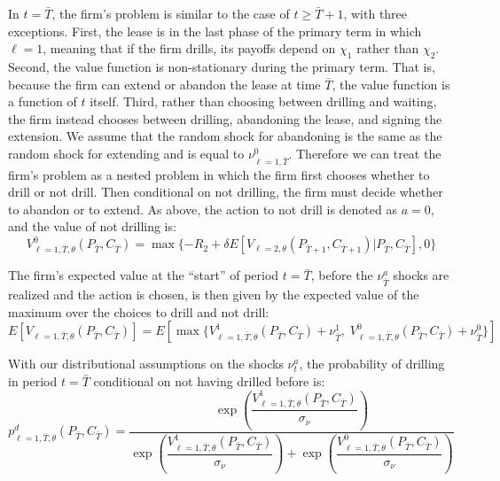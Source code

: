\documentclass[12pt]{article}
\begin{document}
In $t=\bar{T}$, the firm's problem is similar to the case of $t \geq \bar{T} + 1$, with three exceptions. First, the lease is in the last phase of the primary term in which $\ell=1$, meaning that if the firm drills, its payoffs depend on $\chi_1$ rather than $\chi_2$. Second, the value function is non-stationary during the primary term. That is, because the firm can extend or abandon the lease at time $\bar{T}$, the value function is a function of $t$ itself. Third, rather than choosing between drilling and waiting, the firm instead chooses between drilling, abandoning the lease, and signing the extension. We assume that the random shock for abandoning is the same as the random shock for extending and is equal to $\nu^0_{\ell=1,\bar{T}}$. Therefore we can treat the firm's problem as a nested problem in which the firm first chooses whether to drill or not drill. Then conditional on not drilling, the firm must decide whether to abandon or to extend. As above, the action to not drill is denoted as $a=0$, and the value of not drilling is:
\begin{equation}
V^0_{\ell=1,\bar{T},\theta}(P_{\bar{T}},C_{\bar{T}}) = \max \{ -R_2 + \delta E [V_{\ell=2,\theta}(P_{\bar{T}+1},C_{\bar{T}+1})|P_{\bar{T}},C_{\bar{T}}], 0 \}
\end{equation}

The firm's expected value at the ``start'' of period $t=\bar{T}$, before the $\nu^a_{\bar{T}}$ shocks are realized and the action is chosen, is then given by the expected value of the maximum over the choices to drill and not drill:
\begin{equation}
E [V_{\ell=1,\bar{T},\theta}(P_{\bar{T}},C_{\bar{T}})] =
E [ \max\{ V^1_{\ell=1,\bar{T},\theta}(P_{\bar{T}},C_{\bar{T}}) + \nu^1_{\bar{T}}, \; V^0_{\ell=1,\bar{T},\theta}(P_{\bar{T}},C_{\bar{T}}) + \nu^0_{\bar{T}} \}]
\label{eq:expected_unconditional_value_t_eq_Tbar}
\end{equation}

With our distributional assumptions on the shocks $\nu^a_t$, the probability of drilling in period $t = \bar{T}$ conditional on not having drilled before is:
\begin{equation}
p^d_{\ell=1,\bar{T},\theta}(P_{\bar{T}},C_{\bar{T}}) =
\dfrac{ \exp \left( \dfrac{V^1_{\ell=1,\bar{T},\theta}(P_{\bar{T}},C_{\bar{T}})}{\sigma_{\nu}} \right) }{ \exp \left( \dfrac{V^1_{\ell=1,\bar{T},\theta}(P_{\bar{T}},C_{\bar{T}})}{\sigma_{\nu}} \right) + \exp \left( \dfrac{V^0_{\ell=1,\bar{T},\theta}(P_{\bar{T}},C_{\bar{T}})}{\sigma_{\nu}} \right)  }
\end{equation}
\end{document}
